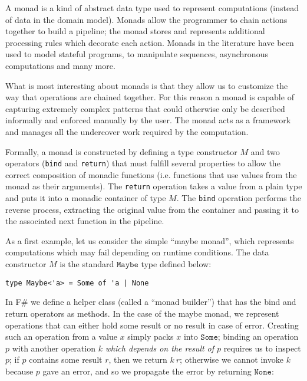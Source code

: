 
A monad \cite{MOGGI_MON,DECL_IMP,COMPR_MON,EFF_MON} is a kind of
abstract data type used to represent computations (instead of data in
the domain model). Monads allow the programmer to chain actions
together to build a pipeline; the monad stores and represents
additional processing rules which decorate each action. Monads in the
literature have been used to model stateful programs, to manipulate
sequences, asynchronous computations and many more. 

What is most interesting about monads is that they allow us to
customize the way that operations are chained together. For this
reason a monad is capable of capturing extremely complex patterns that
could otherwise only be described informally and enforced manually by
the user. The monad acts as a framework and manages all the undercover
work required by the computation.  

Formally, a monad is constructed by defining a type constructor $M$
and two operators (\texttt{bind} and \texttt{return}) that must
fulfill several properties to allow the correct composition of monadic
functions (i.e. functions that use values from the monad as their
arguments). The \texttt{return} operation takes a value from a plain
type and puts it into a monadic container of type $M$. The
\texttt{bind} operation performs the reverse process, extracting the
original value from the container and passing it to the associated
next function in the pipeline. 

As a first example, let us consider the simple ``maybe monad'', which
represents computations which may fail depending on runtime
conditions. The data constructor $M$ is the standard $\mathtt{Maybe}$
type defined below: 
\begin{lstlisting}
type Maybe<'a> = Some of 'a | None
\end{lstlisting}

In F\# we define a helper class (called a ``monad builder'') that has
the bind and return operators as methods. In the case of the maybe
monad, we represent operations that can either hold some result or no
result in case of error. Creating such an operation from a value $x$
simply packs $x$ into $\mathtt{Some}$; binding an operation $p$ with another
operation $k$ \textit{which depends on the result of $p$} requires us
to inspect $p$; if $p$ contains some result $r$, then we return $k\
r$; otherwise we cannot invoke $k$ because $p$ gave an error, and so
we propagate the error by returning $\mathtt{None}$: 

